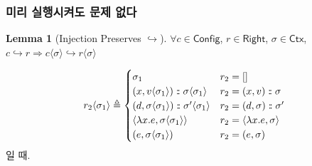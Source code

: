 \documentclass{beamer}
\theoremstyle{definition}
\newtheorem*{lemma*}{Lemma}
\newcommand*{\cons}{:{\hspace{-0.7em}}:}
\newcommand*{\modid}{d}
\newcommand*{\ctx}{\sigma}
\newcommand*{\Ctx}{\mathsf{Ctx}}
\newcommand*{\Config}{\mathsf{Config}}
\newcommand*{\config}{c}
\newcommand*{\Right}{\mathsf{Right}}
\newcommand*{\rightst}{r}
\newcommand*{\semarrow}{\hookrightarrow}
\newcommand*{\semlink}{\mathbin{\rotatebox[origin=c]{180}{$\propto$}}}
\newcommand*{\inject}[2]{{#2}\langle{#1}\rangle}
\begin{document}
\begin{frame}[c]
  \frametitle{미리 실행시켜도 문제 없다}
  \begin{lemma*}[Injection Preserves $\semarrow$]\label{lem:injpreseval}
    $\forall\config\in\Config$, $\rightst\in\Right$, $\ctx\in\Ctx$,
    $\config\semarrow\rightst\Rightarrow\inject{\ctx}{\config}\semarrow\inject{\ctx}{\rightst}$
  \end{lemma*}

  \pause

  {\footnotesize
    \[
      \inject{\ctx_{1}}{r_{2}}\triangleq
      \begin{cases}
        \ctx_1                                                         & r_{2}=[]                           \\
        (x, \inject{\ctx_1}{v})\cons\inject{\ctx_{1}}{\ctx}            & r_{2}=(x,v)\cons \ctx              \\
        (\modid, \inject{\ctx_{1}}{\ctx})\cons\inject{\ctx_{1}}{\ctx'} & r_{2}=(\modid,\ctx)\cons \ctx'     \\
        \langle\lambda x.e,\inject{\ctx_1}{\ctx}\rangle                & r_2=\langle\lambda x.e,\ctx\rangle \\
        (e,\inject{\ctx_1}{\ctx})                                      & r_2 = (e, \ctx)
      \end{cases}
    \]}%
  일 때.
\end{frame}
%
\end{document}
